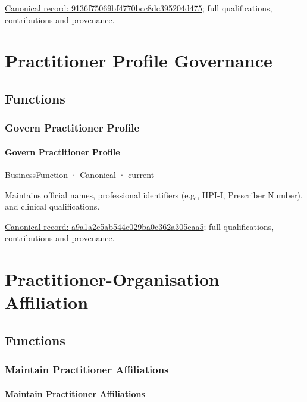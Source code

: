 {\footnotesize \href{../../../../continuum/business/business-function/9136f75069bf4770bcc8dc395204d475.md}{Canonical record: 9136f75069bf4770bcc8dc395204d475}; full qualifications, contributions and provenance.}\par
\section{Practitioner Profile Governance}

\subsection{Functions}

\subsubsection{Govern Practitioner Profile}

\paragraph{Govern Practitioner Profile}

\label{element:a9a1a2c5ab544c029ba0c362a305eaa5}
{\small BusinessFunction · Canonical · current}\par

Maintains official names, professional identifiers (e.g., HPI-I, Prescriber Number), and clinical qualifications.


{\footnotesize \href{../../../../continuum/business/business-function/a9a1a2c5ab544c029ba0c362a305eaa5.md}{Canonical record: a9a1a2c5ab544c029ba0c362a305eaa5}; full qualifications, contributions and provenance.}\par
\section{Practitioner-Organisation Affiliation}

\subsection{Functions}

\subsubsection{Maintain Practitioner Affiliations}

\paragraph{Maintain Practitioner Affiliations}

